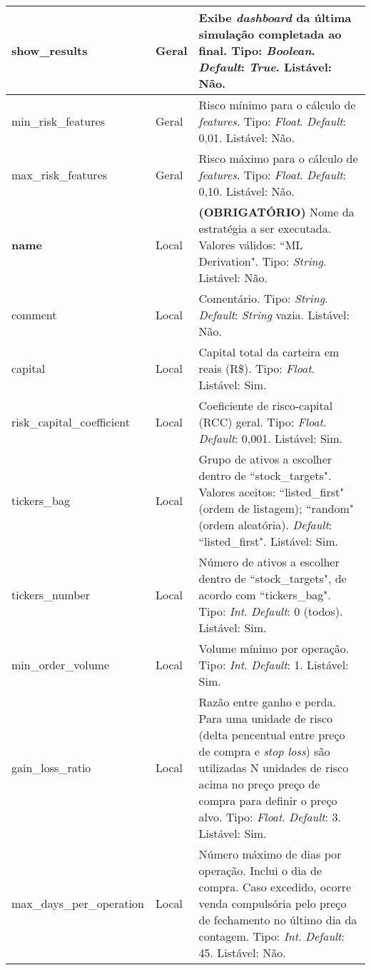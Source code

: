 \begin{center}
{\begin{longtable}[m]{| m{11em} | m{3em}| m{21em} |}
        \hline
        show\_results & Geral & Exibe \textit{dashboard} da última simulação completada ao final. Tipo: \textit{Boolean}. \textit{Default}: \textit{True}. Listável: Não. \\
        \hline
        min\_risk\_features & Geral & Risco mínimo para o cálculo de \textit{features}. Tipo: \textit{Float}. \textit{Default}: 0,01. Listável: Não. \\
        \hline
        max\_risk\_features & Geral & Risco máximo para o cálculo de \textit{features}. Tipo: \textit{Float}. \textit{Default}: 0,10. Listável: Não. \\
        \hline
        \textbf{name} & Local & \textbf{(OBRIGATÓRIO)} Nome da estratégia a ser executada. Valores válidos: ``ML Derivation". Tipo: \textit{String}. Listável: Não. \\
        \hline
        comment & Local & Comentário. Tipo: \textit{String}. \textit{Default}: \textit{String} vazia. Listável: Não. \\
        \hline
        capital & Local & Capital total da carteira em reais (R\$). Tipo: \textit{Float}. Listável: Sim. \\
        \hline
        risk\_capital\_coefficient & Local & Coeficiente de risco-capital (RCC) geral. Tipo: \textit{Float}. \textit{Default}: 0,001. Listável: Sim. \\
        \hline
        tickers\_bag & Local & Grupo de ativos a escolher dentro de ``stock\_targets". Valores aceitos: ``listed\_first" (ordem de listagem); ``random" (ordem aleatória). \textit{Default}: ``listed\_first". Listável: Sim. \\
        \hline
        tickers\_number & Local & Número de ativos a escolher dentro de ``stock\_targets", de acordo com ``tickers\_bag". Tipo: \textit{Int}. \textit{Default}: 0 (todos). Listável: Sim. \\
        \hline
        min\_order\_volume & Local & Volume mínimo por operação. Tipo: \textit{Int}. \textit{Default}: 1. Listável: Sim. \\
        \hline
        gain\_loss\_ratio & Local & Razão entre ganho e perda. Para uma unidade de risco (delta pencentual entre preço de compra e \textit{stop loss}) são utilizadas N unidades de risco acima no preço preço de compra para definir o preço alvo. Tipo: \textit{Float}. \textit{Default}: 3. Listável: Sim. \\
        \hline
        max\_days\_per\_operation & Local & Número máximo de dias por operação. Inclui o dia de compra. Caso excedido, ocorre venda compulsória pelo preço de fechamento no último dia da contagem. Tipo: \textit{Int}. \textit{Default}: 45. Listável: Não. \\

\end{longtable}}
\end{center}
